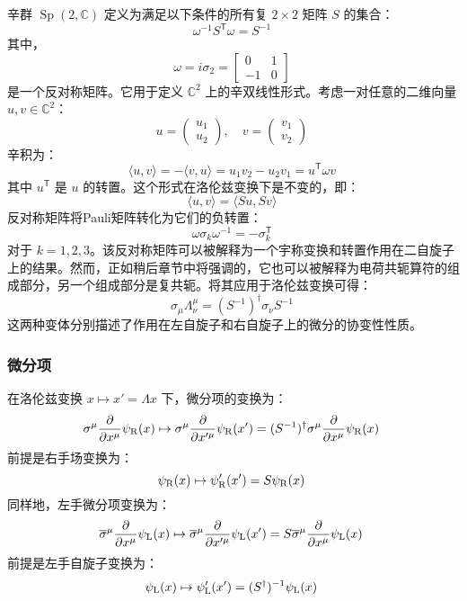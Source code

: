 辛群 \( \operatorname{Sp}(2, \mathbb{C}) \) 定义为满足以下条件的所有复 \( 2 \times 2 \) 矩阵 \( S \) 的集合：
\[
\omega^{-1} S^{\textsf{T}} \omega = S^{-1}~
\]
其中，
\[
\omega = i \sigma_2 = \begin{bmatrix} 0 & 1 \\ -1 & 0 \end{bmatrix}~
\]
是一个反对称矩阵。它用于定义 \( \mathbb{C}^2 \) 上的辛双线性形式。考虑一对任意的二维向量 \( u, v \in \mathbb{C}^2 \)：
\[
u = \begin{pmatrix} u_1 \\ u_2 \end{pmatrix}, \quad v = \begin{pmatrix} v_1 \\ v_2 \end{pmatrix}~
\]
辛积为：
\[
\langle u, v \rangle = - \langle v, u \rangle = u_1 v_2 - u_2 v_1 = u^{\textsf{T}} \omega v~
\]
其中 \( u^{\textsf{T}} \) 是 \( u \) 的转置。这个形式在洛伦兹变换下是不变的，即：
\[
\langle u, v \rangle = \langle S u, S v \rangle~
\]
反对称矩阵将Pauli矩阵转化为它们的负转置：
\[
\omega \sigma_k \omega^{-1} = - \sigma_k^{\textsf{T}}~
\]
对于 \( k = 1, 2, 3 \)。该反对称矩阵可以被解释为一个宇称变换和转置作用在二自旋子上的结果。然而，正如稍后章节中将强调的，它也可以被解释为电荷共轭算符的组成部分，另一个组成部分是复共轭。将其应用于洛伦兹变换可得：
\[
\sigma_{\mu} \Lambda^{\mu}_{\nu} = \left( S^{-1} \right)^{\dagger} \sigma_{\nu} S^{-1}~
\]
这两种变体分别描述了作用在左自旋子和右自旋子上的微分的协变性性质。
\subsubsection{微分项}
在洛伦兹变换 \( x \mapsto x' = \Lambda x \) 下，微分项的变换为：
\[
\sigma^{\mu} \frac{\partial}{\partial x^{\mu}} \psi_{\rm{R}}(x) \mapsto \sigma^{\mu} \frac{\partial}{\partial x'^{\mu}} \psi_{\rm{R}}(x') = (S^{-1})^{\dagger} \sigma^{\mu} \frac{\partial}{\partial x^{\mu}} \psi_{\rm{R}}(x)~
\]
前提是右手场变换为：
\[
\psi_{\rm{R}}(x) \mapsto \psi_{\rm{R}}^{\prime}(x') = S \psi_{\rm{R}}(x)~
\]
同样地，左手微分项变换为：
\[
\overline{\sigma}^{\mu} \frac{\partial}{\partial x^{\mu}} \psi_{\rm{L}}(x) \mapsto \overline{\sigma}^{\mu} \frac{\partial}{\partial x'^{\mu}} \psi_{\rm{L}}(x') = S \overline{\sigma}^{\mu} \frac{\partial}{\partial x^{\mu}} \psi_{\rm{L}}(x)~
\]
前提是左手自旋子变换为：
\[
\psi_{\rm{L}}(x) \mapsto \psi_{\rm{L}}^{\prime}(x') = (S^{\dagger})^{-1} \psi_{\rm{L}}(x)~
\]